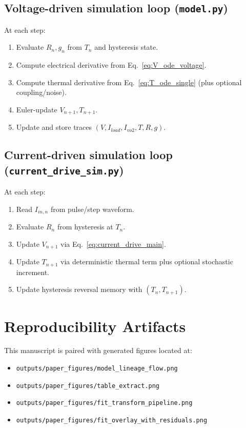 \documentclass[11pt]{article}
\begin{document}
\subsection{Voltage-driven simulation loop (\texttt{model.py})}
At each step:
\begin{enumerate}
    \item Evaluate \(R_n,g_n\) from \(T_n\) and hysteresis state.
    \item Compute electrical derivative from Eq.~\eqref{eq:V_ode_voltage}.
    \item Compute thermal derivative from Eq.~\eqref{eq:T_ode_single} (plus optional coupling/noise).
    \item Euler-update \(V_{n+1},T_{n+1}\).
    \item Update and store traces \((V,I_{load},I_{vo2},T,R,g)\).
\end{enumerate}

\subsection{Current-driven simulation loop (\texttt{current\_drive\_sim.py})}
At each step:
\begin{enumerate}
    \item Read \(I_{in,n}\) from pulse/step waveform.
    \item Evaluate \(R_n\) from hysteresis at \(T_n\).
    \item Update \(V_{n+1}\) via Eq.~\eqref{eq:current_drive_main}.
    \item Update \(T_{n+1}\) via deterministic thermal term plus optional stochastic increment.
    \item Update hysteresis reversal memory with \((T_n,T_{n+1})\).
\end{enumerate}

\section{Reproducibility Artifacts}

This manuscript is paired with generated figures located at:
\begin{itemize}
    \item \texttt{outputs/paper\_figures/model\_lineage\_flow.png}
    \item \texttt{outputs/paper\_figures/table\_extract.png}
    \item \texttt{outputs/paper\_figures/fit\_transform\_pipeline.png}
    \item \texttt{outputs/paper\_figures/fit\_overlay\_with\_residuals.png}
\end{itemize}
\end{document}

